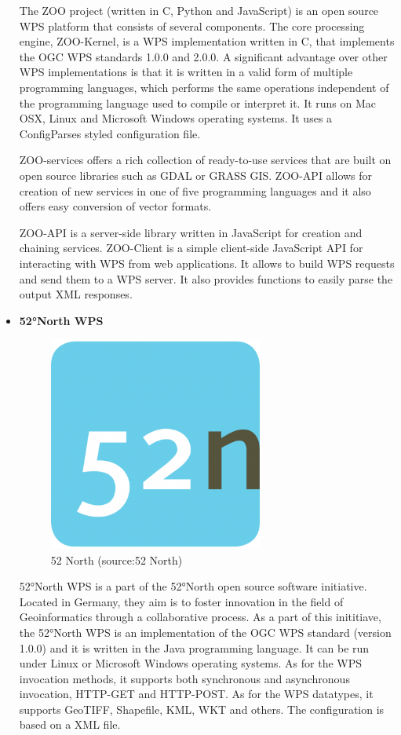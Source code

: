 \begin{itemize}
The ZOO project (written in C, Python and JavaScript) is an open source WPS platform that consists of several components.  The core processing engine, ZOO-Kernel, is a WPS implementation written in C, that implements the OGC WPS standards 1.0.0 and 2.0.0. A significant advantage over other WPS implementations is that it is written in a valid form of multiple programming languages, which performs the same operations independent of the programming language used to compile or interpret it. It runs on Mac OSX, Linux and Microsoft Windows operating systems. It uses a ConfigParses styled configuration file.

ZOO-services offers a rich collection of ready-to-use services that are built on open source libraries such as GDAL or GRASS GIS. ZOO-API allows for creation of new services in one of five programming languages and it also offers easy conversion of vector formats.

ZOO-API is a server-side library written in JavaScript for creation and chaining services. ZOO-Client is a simple client-side JavaScript API for interacting with WPS from web applications. It allows to build WPS requests and send them to a WPS server. It also provides functions to easily parse the output XML responses.


\item \textbf{52°North WPS}

\begin{figure}[H] \centering
      \includegraphics[width=200pt]{./pictures/52n.png}
      \caption[52 North logo]{52 North (source:52 North)}
      \label{fig:52 North}
  \end{figure}

52°North WPS is a part of the 52°North open source software initiative. Located in Germany, they aim is to foster innovation in the field of Geoinformatics through a collaborative process. As a part of this inititiave, the 52°North WPS is an implementation of the OGC WPS standard (version 1.0.0) and it is written in the Java programming language. It can be run under Linux or Microsoft Windows operating systems. As for the WPS invocation methods, it supports both synchronous and asynchronous invocation, HTTP-GET and HTTP-POST. As for the WPS datatypes, it supports GeoTIFF, Shapefile, KML, WKT and others. The configuration is based on a XML file.
	
\end{itemize}
  

